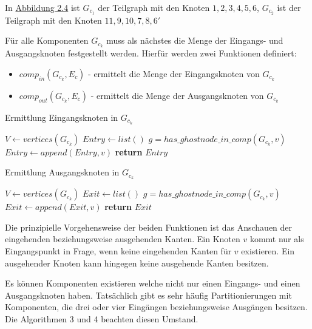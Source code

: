 \begin{bem}
  In \hyperref[fig:components]{Abbildung 2.4} ist $G_{c_1}$ der Teilgraph mit den Knoten $1,2,3,4,5,6$, $G_{c_2}$ ist der Teilgraph
  mit den Knoten
  $11,9,10,7,8,6'$
\end{bem}
Für alle Komponenten $G_{c_k}$ muss als nächstes die Menge der Eingangs- und
Ausgangsknoten festgestellt werden. Hierfür werden zwei Funktionen
definiert:
\begin{itemize}
  \item $comp_{in}(G_{c_k}, E_c)$ - ermittelt die Menge der
    Eingangsknoten von $G_{c_k}$ 
  \item $comp_{out}(G_{c_k}, E_c)$ - ermittelt die Menge der
    Ausgangsknoten von $G_{c_k}$ 
\end{itemize}
\newpage
\begin{algorithm}
  \caption{Ermittlung Eingangsknoten in $G_{c_k}$}\label{alg:comp_in}
\begin{algorithmic}[1]
    \State $V \gets vertices(G_{c_k})$
    \State $Entry \gets list()$
      \State $g = has\_ghostnode\_in\_comp(G_{c_k}, v)$
        \State $Entry \gets append(Entry, v)$
      \EndIf
    \EndForeach
    \State \textbf{return} $Entry$
  \EndProcedure
\end{algorithmic}
\end{algorithm}
\begin{algorithm}
\caption{Ermittlung Ausgangsknoten in $G_{c_k}$}\label{alg:comp_out}
\begin{algorithmic}[1]
    \State $V \gets vertices(G_{c_k})$
    \State $Exit \gets list()$
      \State $g = has\_ghostnode\_in\_comp(G_{c_k}, v)$
        \State $Exit \gets append(Exit, v)$
      \EndIf
    \EndForeach
    \State \textbf{return} $Exit$
  \EndProcedure
\end{algorithmic}
\end{algorithm}
Die prinzipielle Vorgehensweise der beiden Funktionen ist das Anschauen
der eingehenden beziehungsweise ausgehenden Kanten. Ein Knoten $v$ kommt
nur als Eingangspunkt in Frage, wenn keine eingehenden Kanten für $v$
existieren. Ein ausgehender Knoten kann hingegen keine ausgehende Kanten
besitzen.
\begin{bem}
  Es können Komponenten existieren welche nicht nur einen Eingangs- und
  einen Ausgangsknoten haben. Tatsächlich gibt es sehr häufig
  Partitionierungen mit Komponenten, die drei oder vier Eingängen
  beziehungsweise Ausgängen besitzen. Die Algorithmen 3 und 4 beachten
  diesen Umstand.
\end{bem}
